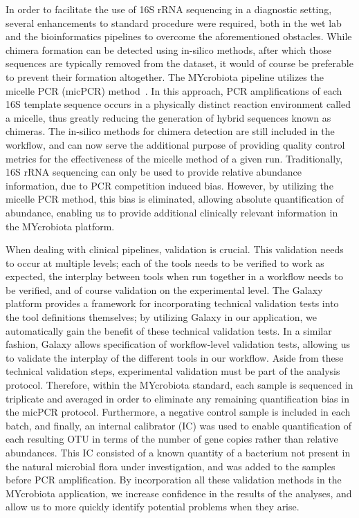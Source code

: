 In order to facilitate the use of 16S rRNA sequencing in a diagnostic setting, several enhancements to standard procedure were required, both in the wet lab and the bioinformatics pipelines to overcome the aforementioned obstacles.
While chimera formation can be detected using in-silico methods, after which those sequences are typically removed from the dataset, it would of course be preferable to prevent their formation altogether. The MYcrobiota pipeline utilizes the micelle PCR (micPCR) method~\cite{boers2015micelle,boers2017novel}. In this approach, PCR amplifications of each 16S template sequence occurs in a physically distinct reaction environment called a micelle, thus greatly reducing the generation of hybrid sequences known as chimeras. The in-silico methods for chimera detection are still included in the workflow, and can now serve the additional purpose of providing quality control metrics for the effectiveness of the micelle method of a given run.
Traditionally, 16S rRNA sequencing can only be used to provide relative abundance information, due to PCR competition induced bias. However, by utilizing the micelle PCR method, this bias is eliminated, allowing absolute quantification of abundance, enabling us to provide additional clinically relevant information in the MYcrobiota platform.

When dealing with clinical pipelines, validation is crucial. This validation needs to occur at multiple levels; each of the tools needs to be verified to work as expected, the interplay between tools when run together in a workflow needs to be verified, and of course validation on the experimental level. The Galaxy platform provides a framework for incorporating technical validation tests into the tool definitions themselves; by utilizing Galaxy in our application, we automatically gain the benefit of these technical validation tests. In a similar fashion, Galaxy allows specification of workflow-level validation tests, allowing us to validate the interplay of the different tools in our workflow. Aside from these technical validation steps, experimental validation must be part of the analysis protocol. Therefore, within the MYcrobiota standard, each sample is sequenced in triplicate and averaged in order to eliminate any remaining quantification bias in the micPCR protocol. Furthermore, a negative control sample is included in each batch, and finally, an internal calibrator (IC) was used to enable quantification of each resulting OTU in terms of the number of gene copies rather than relative abundances. This IC consisted of a known quantity of a bacterium not present in the natural microbial flora under investigation, and was added to the samples before PCR amplification. By incorporation all these validation methods in the MYcrobiota application, we increase confidence in the results of the analyses, and allow us to more quickly identify potential problems when they arise.

